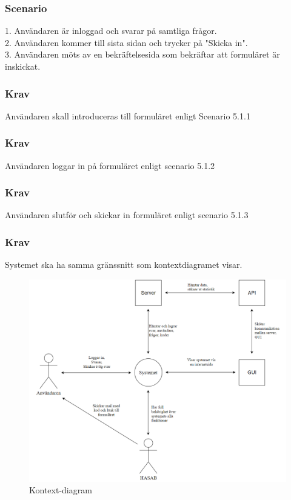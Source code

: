 \documentclass{article}
\begin{document}
    \subsubsection{Scenario}
    1. Användaren är inloggad och svarar på samtliga frågor. \\
    2. Användaren kommer till sista sidan och trycker på "Skicka in". \\
    3. Användaren möts av en bekräftelsesida som bekräftar att formuläret är inskickat.
    
    
    \subsubsection{Krav}
    Användaren skall introduceras till formuläret enligt Scenario 5.1.1
    
    \subsubsection{Krav}
    Användaren loggar in på formuläret enligt scenario 5.1.2
    
    \subsubsection{Krav}
    Användaren slutför och skickar in formuläret enligt scenario 5.1.3
    
    \subsubsection{Krav}
    Systemet ska ha samma gränssnitt som kontextdiagramet visar.
    
    \begin{figure}[h!]
    \caption{Kontext-diagram}
    \includegraphics[width=150mm]{Kontextdiagram.png}
    
    \end{figure}
    
\end{document}
